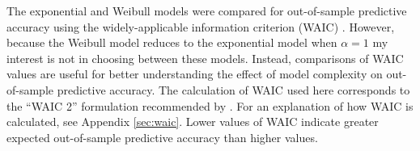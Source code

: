 \documentclass[12pt,letterpaper]{article}
\begin{document}
%
%

The exponential and Weibull models were compared for out-of-sample predictive accuracy using the widely-applicable information criterion (WAIC) \citep{Watanabe2010a}. However, because the Weibull model reduces to the exponential model when \(\alpha = 1\) my interest is not in choosing between these models. Instead, comparisons of WAIC values are useful for better understanding the effect of model complexity on out-of-sample predictive accuracy. The calculation of WAIC used here corresponds to the ``WAIC 2'' formulation recommended by \citet{Gelman2013d}. For an explanation of how WAIC is calculated, see Appendix \ref{sec:waic}. Lower values of WAIC indicate greater expected out-of-sample predictive accuracy than higher values.
\end{document}
